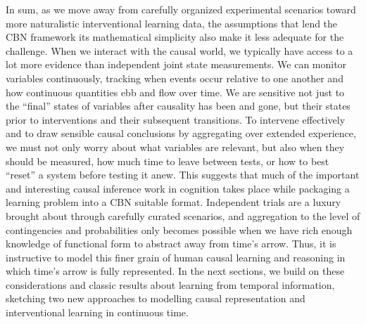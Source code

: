 \documentclass{cambridge7A}%
\begin{document}
In sum, as we move away from carefully organized experimental scenarios toward more naturalistic interventional learning data, the assumptions that lend the CBN framework its mathematical simplicity also make it less adequate for the challenge.  %
When we interact with the causal world, we typically have access to a lot more evidence than independent joint state measurements.  We can monitor variables continuously, tracking when events occur relative to one another and how continuous quantities ebb and flow over time.  We are sensitive not just to the ``final'' states of variables after causality has been and gone, but their states prior to interventions and their subsequent transitions.  To intervene effectively and to draw sensible causal conclusions by aggregating over extended experience, we must not only worry about what variables are relevant, but also when they should be measured, how much time to leave between tests, or how to best ``reset'' a system before testing it anew.  
This suggests that much of the important and interesting causal inference work in cognition takes place while packaging a learning problem into a CBN suitable format.  Independent trials are a luxury brought about through carefully curated scenarios, and aggregation to the level of contingencies and probabilities only becomes possible when we have rich enough knowledge of functional form to abstract away from time's arrow.  Thus, it is instructive to model this finer grain of human causal learning and reasoning in which time's arrow is fully represented.     %
In the next sections, we build on these considerations and classic results about learning from temporal information, sketching two new approaches to modelling causal representation and interventional learning in continuous time.
\end{document}
